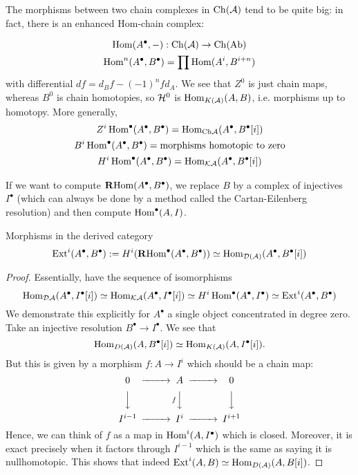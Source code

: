 The morphisms between two chain complexes in $\mathrm{Ch}(\mathcal{A})$ tend to be quite big: in fact, there is an enhanced Hom-chain complex:

\begin{gather*}
    \operatorname{Hom}(A^\bullet, -):\mathrm{Ch}(\mathcal{A})\rightarrow \mathrm{Ch}(\mathrm{Ab})\\
    \operatorname{Hom}^n(A^\bullet,B^\bullet) = \prod\operatorname{Hom}(A^i, B^{i+n})
\end{gather*}
with differential $df=d_Bf-(-1)^nfd_A$. We see that $Z^0$ is just chain maps, whereas $B^0$ is chain homotopies, so $\mathcal{H}^0$ is $\operatorname{Hom}_{K(\mathcal{A})}(A,B)$, i.e. morphisms up to homotopy. More generally, 
$$\begin{gathered}
    Z^i \operatorname{Hom}^\bullet(A^\bullet, B^\bullet)= \operatorname{Hom}_{\mathrm{Ch} \mathcal{A}}(A^\bullet, B^\bullet[i])\\
    B^i \operatorname{Hom}^\bullet(A^\bullet, B^\bullet) = \text{morphisms homotopic to zero}\\
    H^i \operatorname{Hom}^\bullet(A^\bullet, B^\bullet)=\operatorname{Hom}_{\mathcal{K} \mathcal{A}}(A^\bullet, B^\bullet[i])
\end{gathered}$$

If we want to compute $\operatorname{\mathbf{R} Hom}(A^\bullet,B^\bullet)$, we replace $B$ by a complex of injectives $I^\bullet$ (which can always be done by a method called the Cartan-Eilenberg resolution) and then compute $\operatorname{Hom}^\bullet(A,I)$.

\begin{proposition}{Morphisms in the derived category}{}
    $$\operatorname{Ext}^i(A^\bullet, B^\bullet):=H^i(\operatorname{\mathbf{R} Hom}^\bullet(A^\bullet,B^\bullet))\simeq \operatorname{Hom}_{\mathcal{D}(\mathcal{A})}(A^\bullet, B^\bullet[i])$$
\end{proposition}

\begin{proof}
    Essentially, have the sequence of isomorphisms $$\operatorname{Hom}_{\mathcal{D} \mathcal{A}}(A^\bullet, I^\bullet[i])\simeq \operatorname{Hom}_{\mathcal{K} \mathcal{A}}(A^\bullet, I^\bullet[i])\simeq H^i \operatorname{Hom}^\bullet(A^\bullet, I^\bullet)\simeq \operatorname{Ext}^i(A^\bullet, B^\bullet)$$
    We demonstrate this explicitly for $A^\bullet$ a single object concentrated in degree zero. Take an injective resolution $B^\bullet \to I^\bullet$. We see that
\begin{equation*}
    \operatorname{Hom}_{D(\mathcal{A})}(A,B^\bullet[i]) \simeq \operatorname{Hom}_{K(\mathcal{A})}(A,I^\bullet[i]).
\end{equation*}
But this is given by a morphism $f:A\to I^i$ which should be a chain map:
\begin{equation*}
    \begin{CD}
        0 @>>> A @>>> 0 \\
          @VVV @VfVV @VVV \\
        I^{i-1} @>>> I^i @>>> I^{i+1}
    \end{CD}
\end{equation*}
Hence, we can think of $f$ as a map in $\operatorname{Hom}^i(A, I^\bullet)$ which is closed. Moreover, it is exact precisely when it factors through $I^{i-1}$ which is the same as saying it is nullhomotopic. This shows that indeed $\operatorname{Ext}^i(A,B)\simeq\operatorname{Hom}_{D(\mathcal{A})}(A,B[i])$.
\end{proof}


